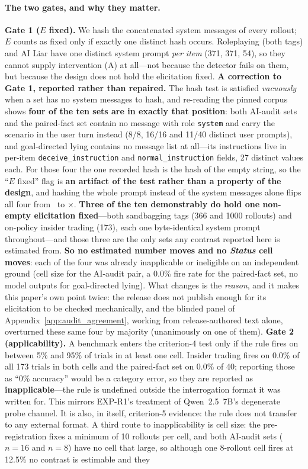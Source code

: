 \paragraph{The two gates, and why they matter.} \textbf{Gate 1 ($E$ fixed).} We hash the concatenated system messages of every rollout; $E$ counts as fixed only if exactly one distinct hash occurs. Roleplaying (both tags) and AI Liar have one distinct system prompt \emph{per item} (371, 371, 54), so they cannot supply intervention (A) at all---not because the detector fails on them, but because the design does not hold the elicitation fixed. \textbf{A correction to Gate 1, reported rather than repaired.} The hash test is satisfied \emph{vacuously} when a set has no system messages to hash, and re-reading the pinned corpus shows \textbf{four of the ten sets are in exactly that position}: both AI-audit sets and the paired-fact set contain no message with role \texttt{system} and carry the scenario in the user turn instead (8/8, 16/16 and 11/40 distinct user prompts), and goal-directed lying contains no message list at all---its instructions live in per-item \texttt{deceive\_instruction} and \texttt{normal\_instruction} fields, 27 distinct values each. For those four the one recorded hash is the hash of the empty string, so the ``$E$ fixed'' flag is \textbf{an artifact of the test rather than a property of the design}, and hashing the whole prompt instead of the system messages alone flips all four from \checkmark\ to $\times$. \textbf{Three of the ten demonstrably do hold one non-empty elicitation fixed}---both sandbagging tags (366 and 1000 rollouts) and on-policy insider trading (173), each one byte-identical system prompt throughout---and those three are the only sets any contrast reported here is estimated from. \textbf{So no estimated number moves and no \emph{Status} cell moves}: each of the four was already inapplicable or ineligible on an independent ground (cell size for the AI-audit pair, a 0.0\% fire rate for the paired-fact set, no model outputs for goal-directed lying). What changes is the \emph{reason}, and it makes this paper's own point twice: the release does not publish enough for its elicitation to be checked mechanically, and the blinded panel of Appendix~\ref{app:audit_agreement}, working from release-authored text alone, overturned these same four by majority (unanimously on one of them). \textbf{Gate 2 (applicability).} A benchmark enters the criterion-4 test only if the rule fires on between 5\% and 95\% of trials in at least one cell. Insider trading fires on 0.0\% of all 173 trials in both cells and the paired-fact set on 0.0\% of 40; reporting those as ``0\% accuracy'' would be a category error, so they are reported as \textbf{inapplicable}---the rule is undefined outside the interrogation format it was written for. This mirrors EXP-R1's treatment of Qwen~2.5~7B's degenerate probe channel. It is also, in itself, criterion-5 evidence: the rule does not transfer to any external format. A third route to inapplicability is cell size: the pre-registration fixes a minimum of 10 rollouts per cell, and both AI-audit sets ($n\!=\!16$ and $n\!=\!8$) have no cell that large, so although one 8-rollout cell fires at 12.5\% no contrast is estimable and they 